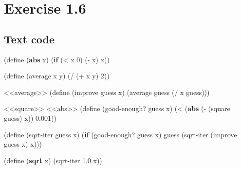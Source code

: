 \documentclass[
]{article}
\newenvironment{Shaded}{}{}
\newcommand{\DecValTok}[1]{\textcolor[rgb]{0.25,0.63,0.44}{#1}}
\newcommand{\ExtensionTok}[1]{#1}
\newcommand{\FloatTok}[1]{\textcolor[rgb]{0.25,0.63,0.44}{#1}}
\newcommand{\FunctionTok}[1]{\textcolor[rgb]{0.02,0.16,0.49}{#1}}
\newcommand{\KeywordTok}[1]{\textcolor[rgb]{0.00,0.44,0.13}{\textbf{#1}}}
\newcommand{\NormalTok}[1]{#1}
\newcommand{\OperatorTok}[1]{\textcolor[rgb]{0.40,0.40,0.40}{#1}}
\begin{document}
\hypertarget{exercise-1.6}{%
\section{Exercise 1.6}\label{exercise-1.6}}

\hypertarget{text-code}{%
\subsection{Text code}\label{text-code}}

\hypertarget{abs}{%
\label{abs}}%
\begin{Shaded}
\begin{Highlighting}[]
\NormalTok{(}\ExtensionTok{define}\FunctionTok{ }\NormalTok{(}\KeywordTok{abs}\NormalTok{ x)}
\NormalTok{  (}\KeywordTok{if}\NormalTok{ (}\OperatorTok{\textless{}}\NormalTok{ x }\DecValTok{0}\NormalTok{)}
\NormalTok{      (}\OperatorTok{{-}}\NormalTok{ x)}
\NormalTok{      x))}
\end{Highlighting}
\end{Shaded}

\hypertarget{average}{%
\label{average}}%
\begin{Shaded}
\begin{Highlighting}[]
\NormalTok{(}\ExtensionTok{define}\FunctionTok{ }\NormalTok{(average x y)}
\NormalTok{  (}\OperatorTok{/}\NormalTok{ (}\OperatorTok{+}\NormalTok{ x y) }\DecValTok{2}\NormalTok{))}
\end{Highlighting}
\end{Shaded}

\hypertarget{txt-sqrt}{%
\label{txt-sqrt}}%
\begin{Shaded}
\begin{Highlighting}[]
\NormalTok{\textless{}\textless{}average\textgreater{}\textgreater{}}
\NormalTok{(}\ExtensionTok{define}\FunctionTok{ }\NormalTok{(improve guess x)}
\NormalTok{  (average guess (}\OperatorTok{/}\NormalTok{ x guess)))}

\NormalTok{\textless{}\textless{}square\textgreater{}\textgreater{}}
\NormalTok{\textless{}\textless{}abs\textgreater{}\textgreater{}}
\NormalTok{(}\ExtensionTok{define}\FunctionTok{ }\NormalTok{(good{-}enough? guess x)}
\NormalTok{  (}\OperatorTok{\textless{}}\NormalTok{ (}\KeywordTok{abs}\NormalTok{ (}\OperatorTok{{-}}\NormalTok{ (square guess) x)) }\FloatTok{0.001}\NormalTok{))}

\NormalTok{(}\ExtensionTok{define}\FunctionTok{ }\NormalTok{(sqrt{-}iter guess x)}
\NormalTok{  (}\KeywordTok{if}\NormalTok{ (good{-}enough? guess x)}
\NormalTok{      guess}
\NormalTok{      (sqrt{-}iter (improve guess x) x)))}

\NormalTok{(}\ExtensionTok{define}\FunctionTok{ }\NormalTok{(}\KeywordTok{sqrt}\NormalTok{ x)}
\NormalTok{  (sqrt{-}iter }\FloatTok{1.0}\NormalTok{ x))}
\end{Highlighting}
\end{Shaded}
\end{document}
